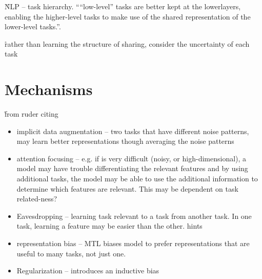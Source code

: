 


\r{NLP -- task hierarchy. ``“low-level” tasks are better kept at the lowerlayers, enabling the higher-level tasks to make use of the shared representation of the lower-level tasks.''\cite{sogaard2016deep}.  }

\r{rather than learning the structure of sharing,  consider the uncertainty of each task }





\section{Mechanisms}

\r{from ruder\cite{DBLP:journals/corr/Ruder17a} citing }



\begin{itemize}[noitemsep,topsep=0pt]
	\item implicit data augmentation -- two tasks that have different noise patterns, may learn better representations though averaging the noise patterns
	\item attention focusing -- e.g. if is very difficult (noisy, or high-dimensional), a model may have trouble differentiating the relevant features and by using additional tasks, the model may be able to use the additional information to determine which features are relevant. This may be dependent on task related-ness?
	\item Eavesdropping -- learning task relevant to a task from another task. In one task, learning a feature may be easier than the other. hints 
	\item representation bias -- MTL biases model to prefer representations that are useful to many tasks, not just one. 
	\item Regularization -- introduces an inductive bias
\end{itemize}

